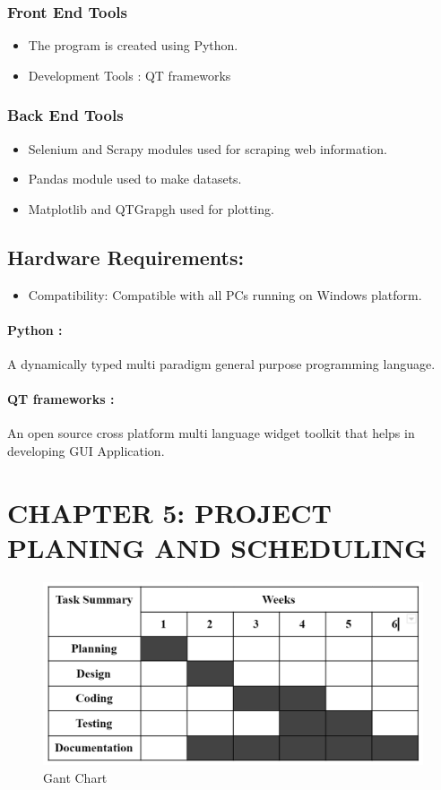 \documentclass{article}
\begin{document}
\subsubsection{Front End Tools}
\begin{itemize}
    \item The program is created using Python.
    \item Development Tools : QT frameworks    
\end{itemize}
\subsubsection{Back End Tools}
\begin{itemize}
    \item Selenium and Scrapy modules used for scraping web information.
    \item Pandas module used to make datasets.
    \item Matplotlib and QTGrapgh used for plotting.
\end{itemize}
\subsection{Hardware Requirements:}
\begin{itemize}
    \item Compatibility: Compatible with all PCs running on Windows platform.
\end{itemize}

\vspace*{20mm}
\paragraph{Python :} A dynamically typed multi paradigm general purpose programming language.
\paragraph{QT frameworks :} An open source cross platform multi language widget toolkit that helps in developing GUI Application.

\clearpage

\section{CHAPTER 5: PROJECT PLANING AND SCHEDULING}
\begin{figure}[h]
    \centerline{\includegraphics[width = 190mm]{chart.png}}
    \caption{Gant Chart}
    \label{fig}
\end{figure}
\end{document}

